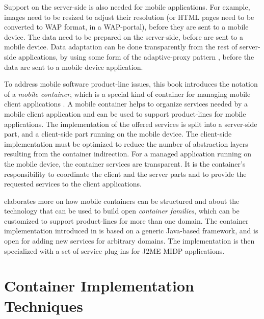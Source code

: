 Support on the server-side is also needed for mobile applications. For example, images need to be resized to adjust their resolution (or HTML pages need to be converted to WAP \cite{www.wap} format, in a WAP-portal), before they are sent to a mobile device. The data need to be prepared on the server-side, before are sent to a mobile device. Data adaptation can be done transparently from the rest of server-side applications, by using some form of the adaptive-proxy pattern \cite{fox96adapting}, before the data are sent to a mobile device application.

To address mobile software product-line issues, this book introduces the notation of a \textit{mobile container}, which is a special kind of container for managing mobile client applications . A mobile container helps to organize services needed by a mobile client application and can be used to support product-lines for mobile applications. The implementation of the offered services is split into a server-side part, and a client-side part running on the mobile device. The client-side implementation must be optimized to reduce the number of abstraction layers resulting from the container indirection. For a managed application running on the mobile device, the container services are transparent. It is the container's responsibility to coordinate the client and the server parts and to provide the requested services to the client applications.

 elaborates more on how mobile containers can be structured and about the technology that can be used to build open \textit{container families}, which can be customized to support product-lines for more than one domain. The container implementation introduced in  is based on a generic Java-based framework, and is open for adding new services for arbitrary domains. The implementation is then specialized with a set of service plug-ins for J2ME MIDP \cite{www.j2me} applications.

\section{Container Implementation Techniques}
\label{c2sec:implement}


